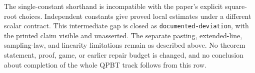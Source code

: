 \documentclass[11pt]{article}
\begin{document}
The single-constant shorthand is incompatible with the paper's explicit
square-root choices. Independent constants give proved local estimates
under a different scalar contract. This intermediate gap is closed as
\texttt{documented-deviation}, with the printed claim visible and
unasserted. The separate pasting, extended-line, sampling-law, and
linearity limitations remain as described above. No theorem statement,
proof, game, or earlier repair budget is changed, and no conclusion about
completion of the whole QPBT track follows from this row.



\end{document}
